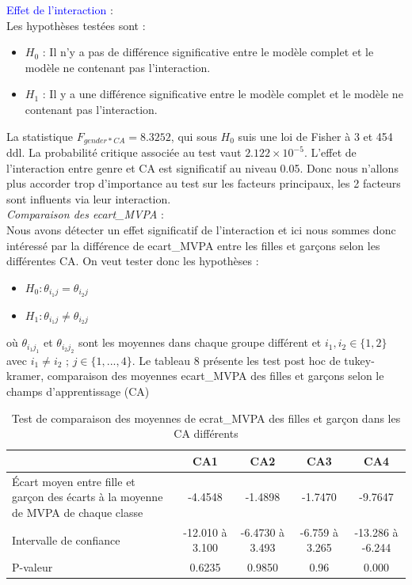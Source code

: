 \documentclass[12pt,a4paper]{article}
\begin{document}
	\textcolor{blue}{Effet de l'interaction} :\\
	Les hypothèses testées sont  : 
	\begin{itemize}
		\item $H_0$ : Il n'y a pas de différence significative entre le modèle complet et le modèle ne contenant pas l'interaction.
		\item $H_1$ : Il y a une différence significative entre le modèle complet et le modèle ne contenant pas l'interaction.
	\end{itemize}
	La statistique $F_{gender*CA} = 8.3252$, qui sous $H_0$ suis une loi de Fisher à 3 et 454 ddl. La probabilité critique associée au test vaut $2.122\times10^{-5}$. L'effet de l'interaction entre genre et CA est significatif au niveau 0.05. Donc nous n'allons plus accorder trop d'importance au test sur les facteurs principaux, les 2 facteurs sont influents via leur interaction.\\
	
	\textit{Comparaison des ecart\_MVPA} : \\
	Nous avons détecter un effet significatif de l'interaction et ici nous sommes donc intéressé par la différence de ecart\_MVPA entre les filles et garçons selon les différentes CA.
	On veut tester donc les hypothèses : 
	\begin{itemize}
		\item $H_0 : \theta_{i_1j} = \theta_{i_2j}$
		\item $H_1 : \theta_{i_1j} \neq \theta_{i_2j}$
	\end{itemize}
	où $\theta_{i_1j_1}$ et $\theta_{i_2j_2}$ sont les moyennes dans chaque groupe différent et $i_1,i_2\in{\{1, 2\}} $ avec $ i_1 \neq i_2$ ; $j\in{\{1,...,4\}} $.
	Le tableau 8 présente les test post hoc de tukey-kramer, comparaison des moyennes ecart\_MVPA des filles et garçons selon le champs d'apprentissage (CA)
	\begin{table}[H]
		\centering
		\begin{tabular}{|p{5cm}|c|c|c|c|}
			\hline
			& CA1 & CA2 & CA3 & CA4 \\ 
			\hline
			Écart moyen entre fille et garçon des écarts à la moyenne de MVPA de chaque classe & -4.4548 & -1.4898 & -1.7470 & -9.7647 \\ 
			\hline
			Intervalle de confiance & -12.010 à 3.100 & -6.4730 à 3.493 & -6.759 à 3.265 & -13.286 à -6.244 \\ 
			\hline
			P-valeur & 0.6235 & 0.9850 & 0.96 & 0.000 \\ 
			\hline
		\end{tabular}
		\caption{ Test de comparaison des moyennes de ecrat\_MVPA des filles et garçon dans les CA différents}
		\label{tab:ecarts_mvpa}
	\end{table}
	
\end{document}
